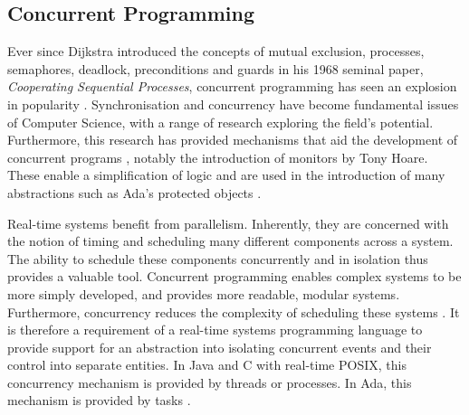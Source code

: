 \subsection{Concurrent Programming}
Ever since Dijkstra introduced the concepts of 
mutual exclusion, processes, semaphores, deadlock, 
preconditions and guards in his 1968 seminal paper,
\emph{Cooperating Sequential Processes}, concurrent programming has seen an
explosion in popularity \cite{Dijkstra}.  Synchronisation and
concurrency have become fundamental issues of Computer Science, with a 
range of research exploring the field's potential. 
Furthermore, this research has provided mechanisms that aid 
the development of concurrent programs
\cite{Sutter:2005:SCR:1095408.1095421,Hansen:1972:SM:361454.361473}, notably
the introduction of monitors by Tony Hoare.
These enable a simplification of logic and are used in the introduction of many
abstractions such as Ada's protected objects
\cite{Hoare:1974:MOS:355620.361161}.  
\par\bigskip\noindent
Real-time systems benefit from parallelism. Inherently, they are
concerned with the notion of timing and scheduling many different components
across a system.  The ability to schedule these components concurrently and in
isolation thus provides a valuable tool. Concurrent programming 
enables complex systems to be more simply developed, and provides 
more readable, modular systems. Furthermore, concurrency reduces the complexity
of scheduling these systems \cite{real-time-systems}.  It is therefore a
requirement of a real-time systems programming language to provide support for
an abstraction into isolating concurrent events and their control into separate
entities.  In Java and C with real-time POSIX, this concurrency mechanism is
provided by threads or processes. In Ada, this mechanism is provided by tasks
\cite[p251]{gehani1989concurrent}.

